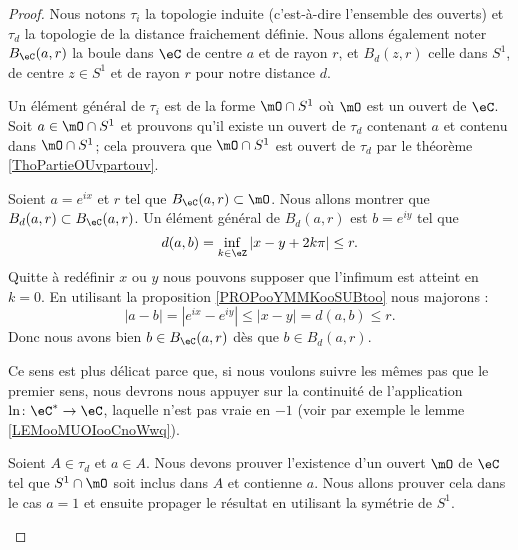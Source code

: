 \begin{proof}
	Nous notons \( \tau_i\) la topologie induite (c'est-à-dire l'ensemble des ouverts) et \( \tau_d\) la topologie de la distance fraichement définie. Nous allons également noter \( B_{\eC}(a,r)\) la boule dans \( \eC\) de centre \( a\) et de rayon \( r\), et \( B_d(z,r)\) celle dans \( S^1\), de centre \( z\in S^1\) et de rayon \( r\) pour notre distance \( d\).
	\begin{subproof}

		Un élément général de \( \tau_i\) est de la forme \( \mO\cap S^1\) où \( \mO\) est un ouvert de \( \eC\). Soit \( a\in \mO\cap S^1\) et prouvons qu'il existe un ouvert de \( \tau_d\) contenant \( a\) et contenu dans \( \mO\cap S^1\); cela prouvera que \( \mO\cap S^1\) est ouvert de \( \tau_d\) par le théorème \ref{ThoPartieOUvpartouv}.

		Soient \( a= e^{ix}\) et \( r\) tel que \( B_{\eC}(a,r)\subset \mO\). Nous allons montrer que \( B_{d}(a,r)\subset B_{\eC}(a,r)\). Un élément général de \( B_d(a,r)\) est \( b= e^{iy}\) tel que
		\begin{equation}
			d(a,b)=\inf_{k\in \eZ}| x-y+2k\pi |\leq r.
		\end{equation}
		Quitte à redéfinir \( x\) ou \( y\) nous pouvons supposer que l'infimum est atteint en \( k=0\). En utilisant la proposition \ref{PROPooYMMKooSUBtoo} nous majorons :
		\begin{equation}
			| a-b |=|  e^{ix}- e^{iy} |\leq | x-y |=d(a,b)\leq r.
		\end{equation}
		Donc nous avons bien \( b\in B_{\eC}(a,r)\) dès que \( b\in B_d(a,r)\).


		Ce sens est plus délicat parce que, si nous voulons suivre les mêmes pas que le premier sens, nous devrons nous appuyer sur la continuité de l'application \( \ln\colon \eC^*\to \eC\), laquelle n'est pas vraie en \( -1\) (voir par exemple le lemme \ref{LEMooMUOIooCnoWwq}).

		Soient \( A\in \tau_d\) et \( a\in A\). Nous devons prouver l'existence d'un ouvert \( \mO\) de \( \eC\) tel que \( S^1\cap\mO\) soit inclus dans \( A\) et contienne \( a\). Nous allons prouver cela dans le cas \( a=1\) et ensuite propager le résultat en utilisant la symétrie de \( S^1\).


\end{subproof}
\end{proof}
